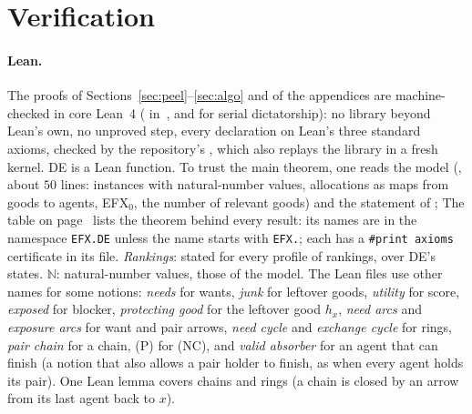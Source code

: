 \documentclass[runningheads,11pt]{llncs}
\newcommand{\efxz}{\texorpdfstring{\mbox{EFX$_0$}}{EFX0}}
\newcommand{\DE}{\textup{DE}}
\begin{document}
\section{Verification}\label{sec:evidence}

\paragraph{Lean.} The proofs of Sections~\ref{sec:peel}--\ref{sec:algo} and of the appendices are machine-checked in core Lean~4 ( in~\cite{Repo}, and  for serial dictatorship): no library beyond Lean's own, no unproved step, every declaration on Lean's three standard axioms, checked by the repository's , which also replays the library in a fresh kernel. \DE{} is a Lean function. To trust the main theorem, one reads the model (, about $50$ lines: instances with natural-number values, allocations as maps from goods to agents, \efxz{}, the number of relevant goods) and the statement of ; The table on page~\pageref{tab:lean} lists the theorem behind every result: its names are in the namespace \texttt{EFX.DE} unless the name starts with \texttt{EFX.}; each has a \texttt{\#print axioms} certificate in its file. \emph{Rankings}: stated for every profile of rankings, over \DE{}'s states. $\mathbb{N}$: natural-number values, those of the model. The Lean files use other names for some notions: \emph{needs} for wants, \emph{junk} for leftover goods, \emph{utility} for score, \emph{exposed} for blocker, \emph{protecting good} for the leftover good $h_x$, \emph{need arcs} and \emph{exposure arcs} for want and pair arrows, \emph{need cycle} and \emph{exchange cycle} for rings, \emph{pair chain} for a chain, (P) for (NC), and \emph{valid absorber} for an agent that can finish (a notion that also allows a pair holder to finish, as when every agent holds its pair). One Lean lemma covers chains and rings (a chain is closed by an arrow from its last agent back to $x$).
\end{document}
